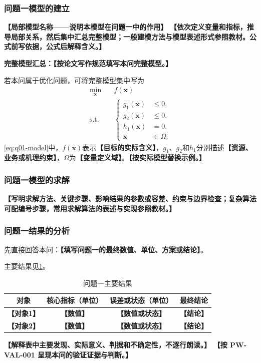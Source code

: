 \documentclass[UTF8,a4paper,12pt,zihao=-4]{ctexart}
\newcommand{\TemplateField}[1]{\textbf{【#1】}}
\begin{document}
\subsubsection{问题一模型的建立}
\noindent\TemplateField{局部模型名称——说明本模型在问题一中的作用}
\TemplateField{依次定义变量和指标，推导局部关系，然后集中汇总完整模型；一般建模方法与模型表述形式参照教材\cite{modelbook}。公式前写依据，公式后解释含义。}

\noindent\textbf{完整模型汇总：}\TemplateField{按论文写作规范填写本问完整模型。}

若本问属于优化问题，可将完整模型集中写为
\begin{equation}
\label{eq:q01-model}
\begin{aligned}
\min_{\symbf{x}}\quad & f(\symbf{x}) \\
\mathrm{s.t.}\quad &
\left\{
\begin{aligned}
g_1(\symbf{x}) &\leq 0,\\
g_2(\symbf{x}) &\leq 0,\\
h_1(\symbf{x}) &= 0,\\
\symbf{x} &\in \Omega .
\end{aligned}
\right.
\end{aligned}
\end{equation}
\cref{eq:q01-model}中，$f(\symbf{x})$表示\TemplateField{目标的实际含义}，$g_1$、$g_2$和$h_1$分别描述\TemplateField{资源、业务或机理约束}，$\Omega$为\TemplateField{变量定义域}。\TemplateField{按实际模型替换示例。}

\subsubsection{问题一模型的求解}
\TemplateField{写明求解方法、关键步骤、影响结果的参数或容差、约束与边界检查；复杂算法可配编号步骤，常用求解算法的表述与实现参照教材\cite{algobook}。}

\subsubsection{问题一结果的分析}
先直接回答本问：\TemplateField{填写问题一的最终数值、单位、方案或结论}。

主要结果见\cref{tab:q01-results}。
\begin{table}[htbp]
  \centering
  \caption{问题一主要结果}
  \label{tab:q01-results}
  \begin{tabular}{cccc}
    \toprule[1.2pt]
    对象 & 核心指标（单位） & 误差或状态（单位） & 最终结论 \\
    \midrule[0.8pt]
    \TemplateField{对象1} & \TemplateField{数值} & \TemplateField{数值或状态} & \TemplateField{结论} \\
    \TemplateField{对象2} & \TemplateField{数值} & \TemplateField{数值或状态} & \TemplateField{结论} \\
    \bottomrule[1.2pt]
  \end{tabular}
\end{table}
\TemplateField{解释表中主要发现、实际意义、判据和不确定性，不逐行朗读。}
\TemplateField{按 PW-VAL-001 呈现本问的验证证据与判断。}
\end{document}
